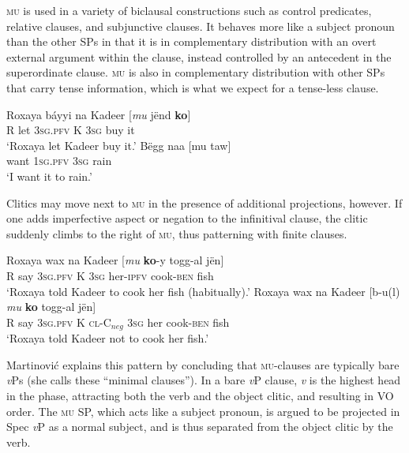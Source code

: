 \documentclass[output=paper]{langscibook}
\begin{document}
\textsc{mu} is used in a variety of biclausal constructions such as control predicates, relative clauses, and subjunctive clauses. It behaves more like a subject pronoun than the other SPs in that it is in complementary distribution with an overt external argument within the clause, instead controlled by an antecedent in the superordinate clause. \textsc{mu} is also in complementary distribution with other SPs that carry tense information, which is what we expect for a tense-less clause. 

\begin{exe}
	\ex 
	\gll Roxaya b\'ayyi na Kadeer [\emph{mu} j\"{e}nd \textbf{ko}]\\
	R let \textsc{3sg.pfv} K \textsc{3sg} buy it\\
	\trans `Roxaya let Kadeer buy it.'
	\ex
	\gll B\"{e}gg naa [mu taw]\\
	want \textsc{1sg.pfv} \textsc{3sg} rain\\
	\trans `I want it to rain.'
\end{exe}

Clitics may move next to \textsc{mu} in the presence of additional projections, however. If one adds imperfective aspect or negation to the infinitival clause, the clitic suddenly climbs to the right of \textsc{mu}, thus patterning with finite clauses. 

\begin{exe}
	\ex \begin{xlist}
		\ex
		\gll Roxaya wax na Kadeer [\emph{mu} \textbf{ko}-y togg-al j\"en] \\
		R say \textsc{3sg.pfv} K \textsc{3sg} her-\textsc{ipfv} cook-\textsc{ben} fish \\
		\trans `Roxaya told Kadeer to cook her fish (habitually).'
		\ex
		\gll Roxaya wax na Kadeer [b-u(l) \emph{mu} \textbf{ko} togg-al j\"en] \\
		R say \textsc{3sg.pfv} K \textsc{cl-C$_{\textit{neg}}$} \textsc{3sg} her cook-\textsc{ben} fish \\
		\trans `Roxaya told Kadeer not to cook her fish.'
	\end{xlist}
\end{exe}

Martinovi\'c explains this pattern by concluding that \textsc{mu}-clauses are typically bare \textit{v}Ps (she calls these ``minimal clauses''). In a bare \textit{v}P clause, \textit{v} is the highest head in the phase, attracting both the verb and the object clitic, and resulting in VO order. The \textsc{mu} SP, which acts like a subject pronoun, is argued to be projected in Spec \textit{v}P as a normal subject, and is thus separated from the object clitic by the verb. 
\end{document}
